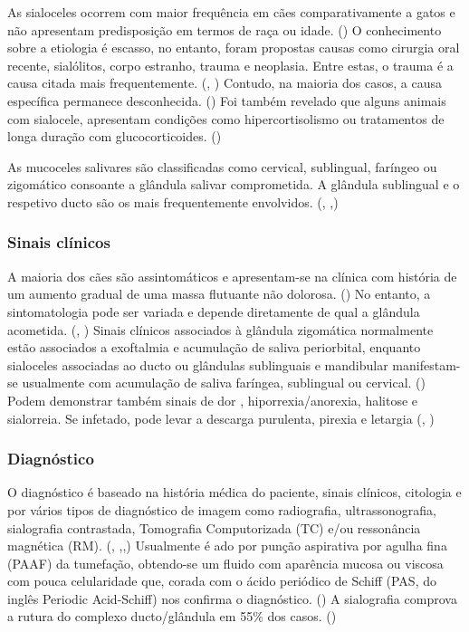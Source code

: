 As sialoceles ocorrem com maior frequência em cães comparativamente a gatos e não apresentam predisposição em termos de raça ou idade. (\cite{Bae2024}) O conhecimento sobre a etiologia é escasso, no entanto, foram propostas causas como cirurgia oral recente, sialólitos, corpo estranho, trauma e neoplasia. Entre estas, o trauma é a causa citada \cite{Kumar2017} mais frequentemente. (\cite{deLaPuerta2020}, \cite{Olimpo2023}) Contudo, na maioria dos casos, a causa específica permanece desconhecida. ({\cite{Cinti2021}}) Foi também revelado que alguns animais com sialocele, apresentam condições como hipercortisolismo ou tratamentos de longa duração com glucocorticoides. (\cite{Bae2024}) 


As mucoceles salivares são classificadas como cervical, sublingual, faríngeo ou zigomático consoante a glândula salivar comprometida. A glândula sublingual e o respetivo ducto são os mais frequentemente envolvidos. (\cite{Poirier2018}, \cite{Cinti2021},\cite{sa_})

\subsubsection{Sinais clínicos}

A maioria dos cães são assintomáticos e apresentam-se na clínica com história de um aumento gradual de uma massa flutuante não dolorosa. (\cite{Poirier2018}) No entanto, a sintomatologia pode ser variada e depende diretamente de qual a glândula acometida. (\cite{deLaPuerta2020}, \cite{sa_}) Sinais clínicos associados à glândula zigomática normalmente estão associados a exoftalmia e acumulação de saliva periorbital, enquanto sialoceles associadas  ao ducto ou glândulas sublinguais e mandibular manifestam-se usualmente com acumulação de saliva faríngea, sublingual ou cervical. (\cite{sa_}) Podem demonstrar também sinais de dor , hiporrexia/anorexia, halitose e sialorreia.  Se infetado, pode levar a descarga purulenta, pirexia e letargia (\cite{sa_}, \cite{Swieton2022})

\subsubsection{Diagnóstico}

O diagnóstico é baseado na história médica do paciente, sinais clínicos, citologia e por vários tipos de diagnóstico de imagem como radiografia, ultrassonografia, sialografia contrastada, Tomografia Computorizada (TC) e/ou ressonância magnética (RM). (\cite{Bae2024}, \cite{sa_},\cite{Olimpo2023},\cite{deLaPuerta2020}) Usualmente é \cite{Kumar2017}ado por punção aspirativa por agulha fina (PAAF) da tumefação, obtendo-se um fluido com aparência mucosa ou viscosa com pouca celularidade que, corada com o ácido periódico de Schiff (PAS, do inglês Periodic Acid-Schiff) nos confirma o diagnóstico. (\cite{Poirier2018}) A sialografia comprova  a rutura do complexo ducto/glândula em 55\% dos casos. (\cite{Olimpo2023}) 

